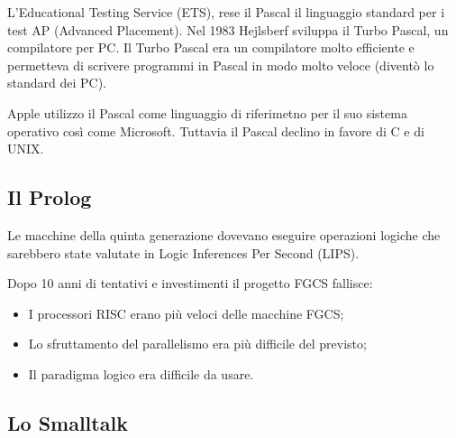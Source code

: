L'Educational Testing Service (ETS), rese il Pascal il linguaggio standard per i test AP (Advanced Placement).
Nel 1983 Hejlsberf sviluppa il Turbo Pascal, un compilatore per PC. Il Turbo Pascal era un compilatore
molto efficiente e permetteva di scrivere programmi in Pascal in modo molto veloce (diventò lo standard dei PC).

Apple utilizzo il Pascal come linguaggio di riferimetno per il suo sistema operativo così come Microsoft.
Tuttavia il Pascal declino in favore di C e di UNIX.

\subsection{Il Prolog}





Le macchine della quinta generazione dovevano eseguire operazioni logiche
che sarebbero state valutate in Logic Inferences Per Second (LIPS).

Dopo 10 anni di tentativi e investimenti il progetto FGCS fallisce:
\begin{itemize}
    \item I processori RISC erano più veloci delle macchine FGCS;
    \item Lo sfruttamento del parallelismo era più difficile del previsto;
    \item Il paradigma logico era difficile da usare.
\end{itemize}

\subsection{Lo Smalltalk}

